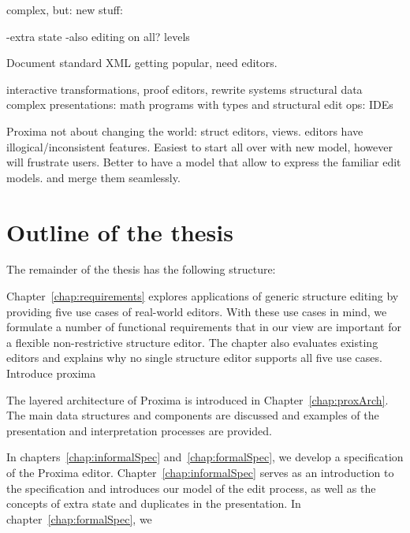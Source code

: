 


%

\bc
complex, but:
new stuff:

-extra state
-also editing on all? levels

Document standard XML getting popular, need editors.

interactive transformations, proof editors, rewrite systems
structural data complex presentations: math
programs with types and structural edit ops: IDEs

Proxima not about changing the world: struct editors, views.  editors have illogical/inconsistent features. Easiest to start all over with new model, however will frustrate users. Better to have a model that allow to express the familiar edit models. and merge them seamlessly.
\ec


\section{Outline of the thesis}

The remainder of the thesis has the following structure:


Chapter~\ref{chap:requirements} explores applications of generic structure editing by providing five use cases of real-world editors. With these use cases in mind, we formulate a number of functional requirements that in our view are important for a flexible non-restrictive structure editor. The chapter also evaluates existing editors and explains why no single structure editor supports all five use cases.
\toHere
Introduce proxima

The layered architecture of Proxima is introduced in Chapter~\ref{chap:proxArch}. The main data structures and components are discussed and examples of the presentation and interpretation processes are provided.

\fromHere
In chapters~\ref{chap:informalSpec} and~\ref{chap:formalSpec}, we develop a specification of the Proxima editor. Chapter~\ref{chap:informalSpec} serves as an introduction to the specification and introduces our model of the edit process, as well as the concepts of extra state and duplicates in the presentation. In chapter~\ref{chap:formalSpec}, we 
\toHere


